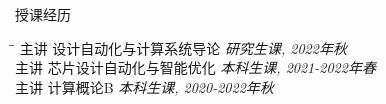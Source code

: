\begin{rSection}{授课经历}

\begin{tabbing}
\hspace{0.8in}\= \hspace{4.2in}\= \kill
主讲 \> 设计自动化与计算系统导论 \> {\em 研究生课, 2022年秋} \\
主讲 \> 芯片设计自动化与智能优化 \> {\em 本科生课, 2021-2022年春 } \\
主讲 \> 计算概论B \> {\em 本科生课, 2020-2022年秋 } \\
\end{tabbing}

\end{rSection}
